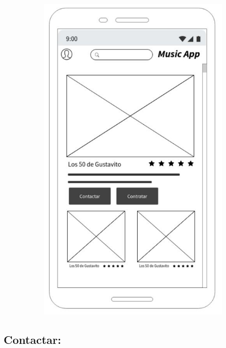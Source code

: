 \begin{figure}[hbt!]
 \centering
\includegraphics[width=12cm, height=16cm,keepaspectratio=true]{Desarrollo/Interfaces/imgs/wire3.JPG}
\end{figure}
\newpage
\subsection{Contactar:}

